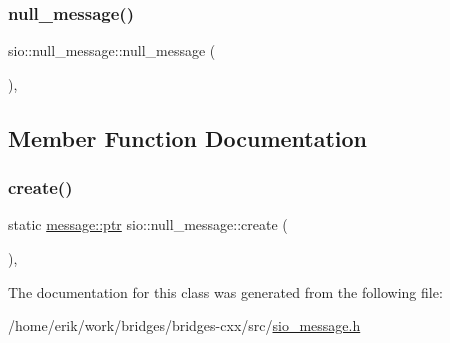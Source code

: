 \subsubsection{\texorpdfstring{null\+\_\+message()}{null\_message()}}
{\footnotesize\ttfamily sio\+::null\+\_\+message\+::null\+\_\+message (\begin{DoxyParamCaption}{ }\end{DoxyParamCaption})\hspace{0.3cm}{\ttfamily [inline]}, {\ttfamily [protected]}}



\subsection{Member Function Documentation}
\mbox{\label{classsio_1_1null__message_a829d67c9ff528a8eef8597c58e868802}} 
\subsubsection{\texorpdfstring{create()}{create()}}
{\footnotesize\ttfamily static \hyperlink{classsio_1_1message_a6340b6fef57e4516eb17928b1885a615}{message\+::ptr} sio\+::null\+\_\+message\+::create (\begin{DoxyParamCaption}{ }\end{DoxyParamCaption})\hspace{0.3cm}{\ttfamily [inline]}, {\ttfamily [static]}}



The documentation for this class was generated from the following file\+:\begin{DoxyCompactItemize}
\item 
/home/erik/work/bridges/bridges-\/cxx/src/\hyperlink{sio__message_8h}{sio\+\_\+message.\+h}\end{DoxyCompactItemize}
